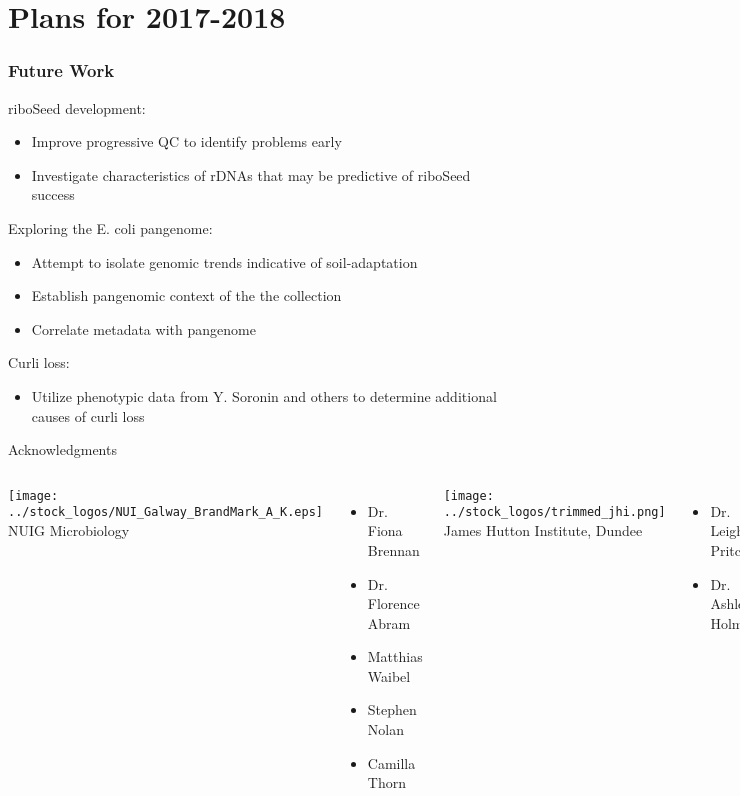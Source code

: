 \documentclass[10pt, compress]{beamer}
\begin{document}
\section{Plans for 2017-2018}
\begin{frame}[fragile]
  \frametitle{Future Work}
  riboSeed development:
  \begin{itemize}
  \item Improve progressive QC to identify problems early
  \item Investigate characteristics of rDNAs that may be predictive of riboSeed success
  \end{itemize}
  Exploring the E. coli pangenome:
  \begin{itemize}
  \item Attempt to isolate genomic trends indicative of soil-adaptation
  \item Establish pangenomic context of the the collection
  \item Correlate metadata with pangenome
  \end{itemize}
  Curli loss:
  \begin{itemize}
  \item Utilize phenotypic data from Y. Soronin and others to determine additional causes of curli loss
  \end{itemize}


\end{frame}



\begin{frame}{Acknowledgments}
  \begin{columns}[onlytextwidth]
    \texttt{[image: ../stock\_logos/NUI\_Galway\_BrandMark\_A\_K.eps]}\\
     NUIG Microbiology
      \begin{itemize}
        \item Dr. Fiona Brennan
        \item Dr. Florence Abram
        \item Matthias Waibel
        \item Stephen Nolan
        \item Camilla Thorn
      \end{itemize}

    \texttt{[image: ../stock\_logos/trimmed\_jhi.png]}\\
      James Hutton Institute, Dundee
      \begin{itemize}
        \item Dr. Leighton Pritchard
        \item Dr. Ashleigh Holmes
      \end{itemize}
  \end{columns}
\end{frame}



\end{document}
